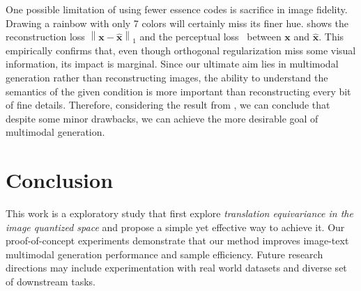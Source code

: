 \documentclass{article}
\begin{document}
One possible limitation of using fewer essence codes is sacrifice in image fidelity.
Drawing a rainbow with only 7 colors will certainly miss its finer hue.
 shows the reconstruction loss $\left\| \mathbf{x}-\hat{\mathbf{x}} \right\|_1$ and the perceptual loss~\cite{zhang2018unreasonable} between $\mathbf{x}$ and $\hat{\mathbf{x}}$. 
This empirically confirms that, even though orthogonal regularization miss some visual information, its impact is marginal.
Since our ultimate aim lies in multimodal generation rather than reconstructing images, the ability to understand the semantics of the given condition is more important than reconstructing every bit of fine details. 
Therefore, considering the result from , we can conclude that despite some minor drawbacks, we can achieve the more desirable goal of multimodal generation.


\section{Conclusion}

This work is a exploratory study that first explore \emph{translation equivariance in the image quantized space} and propose a simple yet effective way to achieve it.
Our proof-of-concept experiments demonstrate that our method improves image-text multimodal generation performance and sample efficiency.
Future research directions may include experimentation with real world datasets and diverse set of downstream tasks.









\clearpage 



\end{document}

